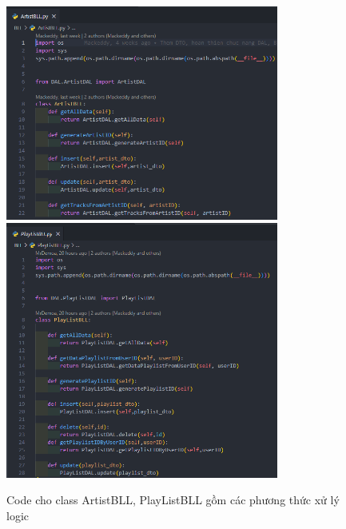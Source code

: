 \documentclass[a4paper]{article}
\begin{document}
\clearpage
\newpage
\begin{figure}[h]
	\centering
	\includegraphics[width=0.8\textwidth]{images/artistBLL.png}
	\includegraphics[width=0.8\textwidth]{images/PlayListBLL.png}
	\caption{Code cho class ArtistBLL, PlayListBLL gồm các phương thức xử lý logic}
\end{figure}
\end{document}
